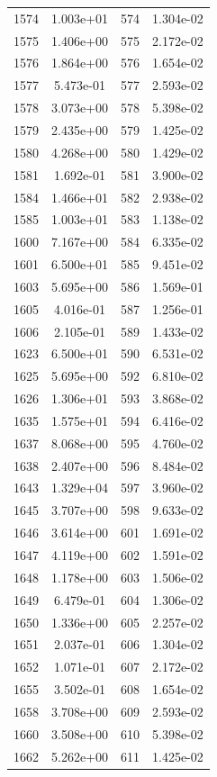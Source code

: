 \documentclass[12pt]{article}
\begin{document}
\begin{longtable}{@{}cccc@{}}
1574 & 1.003e+01 & 574 & 1.304e-02 \\
1575 & 1.406e+00 & 575 & 2.172e-02 \\
1576 & 1.864e+00 & 576 & 1.654e-02 \\
1577 & 5.473e-01 & 577 & 2.593e-02 \\
1578 & 3.073e+00 & 578 & 5.398e-02 \\
1579 & 2.435e+00 & 579 & 1.425e-02 \\
1580 & 4.268e+00 & 580 & 1.429e-02 \\
1581 & 1.692e-01 & 581 & 3.900e-02 \\
1584 & 1.466e+01 & 582 & 2.938e-02 \\
1585 & 1.003e+01 & 583 & 1.138e-02 \\
1600 & 7.167e+00 & 584 & 6.335e-02 \\
1601 & 6.500e+01 & 585 & 9.451e-02 \\
1603 & 5.695e+00 & 586 & 1.569e-01 \\
1605 & 4.016e-01 & 587 & 1.256e-01 \\
1606 & 2.105e-01 & 589 & 1.433e-02 \\
1623 & 6.500e+01 & 590 & 6.531e-02 \\
1625 & 5.695e+00 & 592 & 6.810e-02 \\
1626 & 1.306e+01 & 593 & 3.868e-02 \\
1635 & 1.575e+01 & 594 & 6.416e-02 \\
1637 & 8.068e+00 & 595 & 4.760e-02 \\
1638 & 2.407e+00 & 596 & 8.484e-02 \\
1643 & 1.329e+04 & 597 & 3.960e-02 \\
1645 & 3.707e+00 & 598 & 9.633e-02 \\
1646 & 3.614e+00 & 601 & 1.691e-02 \\
1647 & 4.119e+00 & 602 & 1.591e-02 \\
1648 & 1.178e+00 & 603 & 1.506e-02 \\
1649 & 6.479e-01 & 604 & 1.306e-02 \\
1650 & 1.336e+00 & 605 & 2.257e-02 \\
1651 & 2.037e-01 & 606 & 1.304e-02 \\
1652 & 1.071e-01 & 607 & 2.172e-02 \\
1655 & 3.502e-01 & 608 & 1.654e-02 \\
1658 & 3.708e+00 & 609 & 2.593e-02 \\
1660 & 3.508e+00 & 610 & 5.398e-02 \\
1662 & 5.262e+00 & 611 & 1.425e-02 \\

\end{longtable}
\end{document}
